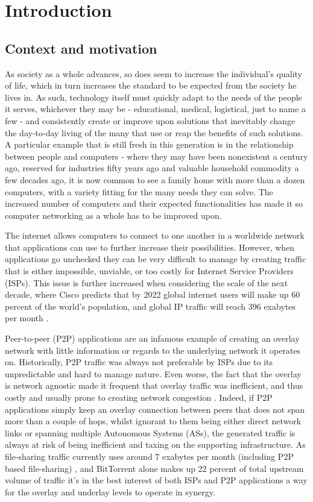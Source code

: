 \chapter{Introduction}

\section{Context and motivation}

    As society as a whole advances, so does seem to increase the individual's quality of life, which in turn increases the standard to be expected from the society he lives in.
    As such, technology itself must quickly adapt to the needs of the people it serves, whichever they may be - educational, medical, logistical, just to name a few - and consistently create or improve upon solutions that inevitably change the day-to-day living of the many that use or reap the benefits of such solutions.
    A particular example that is still fresh in this generation is in the relationship between people and computers - where they may have been nonexistent a century ago, reserved for industries fifty years ago and valuable household commodity a few decades ago, it is now common to see a family home with more than a dozen computers, with a variety fitting for the many needs they can solve.
    The increased number of computers and their expected functionalities has made it so computer networking as a whole has to be improved upon.

    The internet allows computers to connect to one another in a worldwide network that applications can use to further increase their possibilities.
However, when applications go unchecked they can be very difficult to manage by creating traffic that is either impossible, unviable, or too costly for Internet Service Providers (ISPs).
    This issue is further increased when considering the scale of the next decade, where Cisco predicts that by 2022 global internet users will make up 60 percent of the world’s population, and global IP traffic will reach 396 exabytes per month \cite{cisco}.

    Peer-to-peer (P2P) applications are an infamous example of creating an overlay network with little information or regards to the underlying network it operates on.
    Historically, P2P traffic was always not preferable by ISPs due to its unpredictable and hard to manage nature.
    Even worse, the fact that the overlay is network agnostic made it frequent that overlay traffic was inefficient, and thus costly and usually prone to creating network congestion \cite{dan-Commag10}.
    Indeed, if P2P applications simply keep an overlay connection between peers that does not span more than a couple of hops, whilst ignorant to them being either direct network links or spanning multiple Autonomous Systems (ASs), the generated traffic is always at risk of being inefficient and taxing on the supporting infrastructure.
    As file-sharing traffic currently uses around 7 exabytes per month (including P2P based file-sharing) \cite{cisco}, and BitTorrent alone makes up 22 percent of total upstream volume of traffic \cite{sandvine} it's in the best interest of both ISPs and P2P applications a way for the overlay and underlay levels to operate in synergy.

